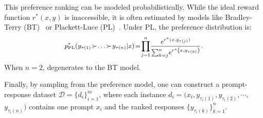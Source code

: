

 This  preference ranking can be modeled probabilistically. While the ideal reward function \( r^*(x, y) \) is inaccessible, it is often estimated  by models like Bradley-Terry (BT)~\cite{BT} or Plackett-Luce (PL)~\cite{PL1, PL2}. Under PL, the preference distribution is:  
\begin{equation}
	\label{eq:PL_distribution}
	\fontsize{9}{3}\selectfont{
		\begin{aligned}
			p_{\text{PL}}^*(y_{\tau(1)} \! \succ\!  \dots \! \succ\!  y_{\tau(n)}  | x )\!=\! \prod\limits_{j=1}^{n}\!\frac{e^{r^*(x,y_{\tau(j)})}}{\sum\nolimits_{k=j}^{n}\!e^{r^{*}\left(x,y_{\tau(k)}\right)}}.
	\end{aligned}}
\end{equation}
When $n = 2$,  degenerates  to the BT model. 


Finally, by sampling  from  the preference model, one can construct a prompt-response dataset $\mathcal{D}=\{d_i\}_{i=1}^m$, where each instance $d_{i}=(x_{i}, y_{\tau_{i}{(1)}}, y_{\tau_{i}{(2)}}, \cdots, $ $y_{\tau_{i}{(n)}})$ contains one prompt $x_{i}$ and the   ranked responses $\{y_{\tau_i(k)}\}_{k=1}^n$. 
 
